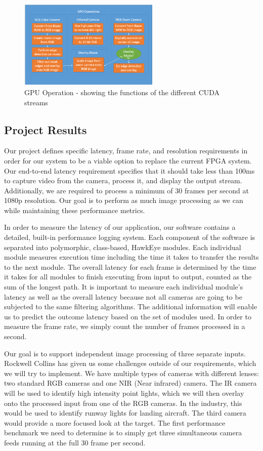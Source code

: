 \begin{figure}[H] 
	\centering
	\includegraphics[width=0.6\textwidth,natwidth=610,natheight=642]{images/GPU.png}
	\caption{GPU Operation - showing the functions of the different CUDA streams}  
	\end{figure}
	
\subsection{Project Results}
Our project defines specific latency, frame rate, and resolution requirements in order for our system to be a viable option to replace the current FPGA system. Our end-to-end latency requirement specifies that it should take less than 100ms to capture video from the camera, process it, and display the output stream. Additionally, we are required to process a minimum of 30 frames per second at 1080p resolution. Our goal is to perform as much image processing as we can while maintaining these performance metrics.
\par
In order to measure the latency of our application, our software contains a detailed, built-in performance logging system. Each component of the software is separated into polymorphic, class-based, HawkEye modules. Each individual module measures execution time including the time it takes to transfer the results to the next module. The overall latency for each frame is determined by the time it takes for all modules to finish executing from input to output, counted as the sum of the longest path. It is important to measure each individual module's latency as well as the overall latency because not all cameras are going to be subjected to the same filtering algorithms. The additional information will enable us to predict the outcome latency based on the set of modules used. In order to measure the frame rate, we simply count the number of frames processed in a second.
\par
Our goal is to support independent image processing of three separate inputs. Rockwell Collins has given us some challenges outside of our requirements, which we will try to implement. We have multiple types of cameras with different lenses: two standard RGB cameras and one NIR (Near infrared) camera. The IR camera will be used to identify high intensity point lights, which we will then overlay onto the processed input from one of the RGB cameras. In the industry, this would be used to identify runway lights for landing aircraft. The third camera would provide a more focused look at the target. The first performance benchmark we need to determine is to simply get three simultaneous camera feeds running at the full 30 frame per second.\\

